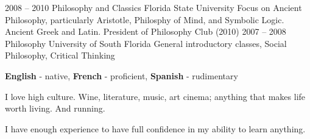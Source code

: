 \documentclass[9pt]{developercv} %
\begin{document}


\begin{entrylist}
	\entry
		{2008 -- 2010}
		{Philosophy and Classics}
		{Florida State University}
        {Focus on Ancient Philosophy, particularly Aristotle, Philosphy of Mind,
        and Symbolic Logic. Ancient Greek and Latin. President of Philosophy
        Club (2010)}
	\entry
		{2007 -- 2008}
		{Philosophy}
		{University of South Florida}
        {General introductory classes, Social Philosophy, Critical Thinking}
\end{entrylist}


\begin{minipage}[t]{0.3\textwidth}
	\vspace{-\baselineskip} %


	\textbf{English} - native,
	\textbf{French} - proficient,
	\textbf{Spanish} - rudimentary
\end{minipage}
\hfill
\begin{minipage}[t]{0.3\textwidth}
	\vspace{-\baselineskip} %


	I love high culture. Wine, literature, music, art cinema; anything that
    makes life worth living. And running.
\end{minipage}
\hfill
\begin{minipage}[t]{0.3\textwidth}
	\vspace{-\baselineskip} %


    I have enough experience to have full confidence in my ability to learn
    anything.
\end{minipage}

\end{document}
